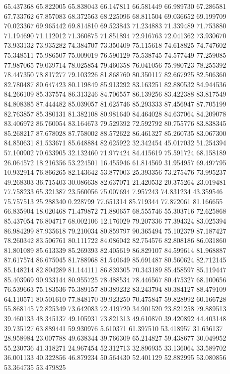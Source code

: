 65.437368
65.822005
65.838043
66.147811
66.581449
66.989730
67.286581
67.733762
67.857083
68.372563
68.225096
68.811504
69.036652
69.199709
70.023367
69.965442
69.814810
69.523843
71.234883
71.339489
71.753880
71.194690
71.112012
71.360875
71.851894
72.916763
72.041362
73.930670
73.933132
73.935282
74.384707
73.350409
75.115618
74.618825
74.747602
75.348511
75.986507
75.009019
76.590129
75.538745
74.577449
77.259085
77.987065
79.039714
78.025854
79.460358
76.041056
75.980723
78.255392
78.447350
78.817277
79.103226
81.868760
80.350117
82.667925
82.506360
82.780487
80.647423
80.119849
85.913292
83.163251
82.880532
84.944536
84.266109
85.337574
86.313246
84.706557
86.139256
83.422388
83.817549
84.808385
87.444482
85.039057
81.625746
85.293333
87.456947
87.705199
82.763857
85.380131
81.382108
80.981640
84.464028
84.637064
84.209078
83.406972
86.760054
83.164673
79.529392
72.592792
80.755776
83.838345
85.268217
87.678028
87.758002
88.572622
86.461327
85.260735
83.067300
84.850631
81.533671
85.648884
82.625922
32.342454
45.017032
51.254394
57.100902
70.633905
32.132460
71.977424
84.415619
75.591724
68.158189
26.064572
18.216356
53.224501
16.455946
61.814569
31.954957
69.497795
10.932914
76.866265
82.143642
53.877003
25.393356
73.275476
73.995237
49.268303
36.715403
30.086638
82.637071
21.420532
20.375264
23.019481
77.758233
65.321387
23.560056
75.007694
7.957243
74.831234
43.359546
75.757513
25.288340
0.228799
77.651314
85.719344
77.872061
81.166655
66.835904
18.020468
71.479872
71.880657
68.555746
55.303716
72.625868
85.437054
76.804717
68.002106
12.176029
79.207336
77.394324
83.025394
86.984299
87.935618
79.210034
80.859797
90.365494
75.102379
87.187427
78.260342
83.506761
80.111722
84.086042
82.754576
82.808186
86.031860
81.801089
85.613339
85.269393
82.405619
86.829107
84.599614
81.968887
87.617574
86.675045
81.788968
81.540649
85.691487
80.560624
82.712145
85.148214
82.804289
81.144111
86.839305
70.343189
85.458597
85.119447
85.403969
90.933144
80.955725
78.488534
78.446567
80.475327
68.100656
76.539663
75.183536
75.389157
80.389232
83.243794
80.384127
88.479109
64.110571
80.501610
77.848170
39.923250
70.475847
59.828992
60.166728
55.868145
72.825349
73.642083
72.419720
34.901520
23.821258
79.889513
39.460133
48.345137
49.105931
73.821313
49.610870
39.420892
44.403148
39.735127
63.889441
59.930976
5.610371
61.397510
53.418957
31.636137
28.958984
23.007788
49.638344
39.766309
65.214827
59.438677
30.049952
55.230736
41.318271
24.967454
52.312713
32.896935
33.136064
33.589702
36.001133
40.322856
46.879234
50.564430
52.401129
52.882995
53.080856
53.364735
53.479825
